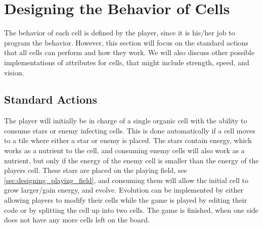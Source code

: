 \section{Designing the Behavior of Cells}
\label{sec:designingBehaviorCells}

The behavior of each cell is defined by the player, since it is his/her job to program the behavior.
However, this section will focus on the standard actions that all cells can perform and how they work.
We will also discuss other possible implementations of attributes for cells, that might include strength, speed, and vision.

\subsection{Standard Actions}

The player will initially be in charge of a single organic cell with the ability to consume stars or enemy infecting cells.
This is done automatically if a cell moves to a tile where either a star or enemy is placed.
The stars contain energy, which works as a nutrient to the cell, and consuming enemy cells will also work as a nutrient, but only if the energy of the enemy cell is smaller than the energy of the players cell.
These stars are placed on the playing field, see \autoref{sec:designing_playing_field}, and consuming them will allow the initial cell to grow larger/gain energy, and evolve.
Evolution can be implemented by either allowing players to modify their cells while the game is played by editing their code or by splitting the cell up into two cells.
The game is finished, when one side does not have any more cells left on the board.\newline

